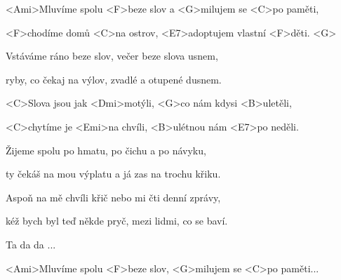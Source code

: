 

\zs
<Ami>Mluvíme spolu <F>beze slov a <G>milujem se <C>po paměti,

<F>chodíme domů <C>na ostrov, <E7>adoptujem vlastní <F>děti. <G>
\ks

\zs
Vstáváme ráno beze slov, večer beze slova usnem,

ryby, co čekaj na výlov, zvadlé a otupené dusnem.
\ks

\zr
<C>Slova jsou jak <Dmi>motýli, <G>co nám kdysi <B>uletěli,

<C>chytíme je <Emi>na chvíli, <B>ulétnou nám <E7>po neděli.
\kr

\zs
Žijeme spolu po hmatu, po čichu a po návyku,

ty čekáš na mou výplatu a já zas na trochu křiku.
\ks

\zs
Aspoň na mě chvíli křič nebo mi čti denní zprávy,

kéž bych byl teď někde pryč, mezi lidmi, co se baví.
\ks

\zr Ta da da ... \kr


<Ami>Mluvíme spolu <F>beze slov, <G>milujem se <C>po 
paměti...

\kp
